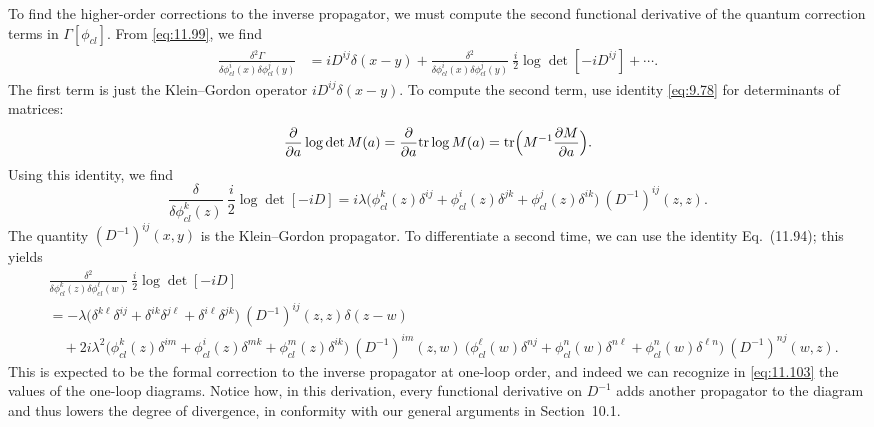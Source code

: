 To find the higher-order corrections to the inverse propagator, we must
compute the second functional derivative of the quantum correction terms in
$\Gamma[\phi_{cl}]$.  From \eqref{eq:11.99}, we find
\begin{equation}
  \begin{aligned}
    \frac{\delta^2\Gamma}{\delta\phi^i_{cl}(x)\delta\phi^j_{cl}(y)}
    &= iD^{ij}\delta(x-y) + \frac{\delta^2}{\delta\phi^i_{cl}(x)
      \delta\phi^j_{cl}(y)}\ \frac{i}{2}\log\det[-iD^{ij}] + \cdots .
  \end{aligned}
\end{equation}
The first term is just the Klein--Gordon operator $iD^{ij}\delta(x-y)$.  To
compute the second term, use identity \eqref{eq:9.78} for determinants of
matrices:
\begin{equation}
  \frac{\partial}{\partial a}\log\det M(a) = \frac{\partial}{\partial a}
    \mathrm{tr}\log M(a) = \mathrm{tr}\Bigl( M^{-1}\frac{\partial M}
      {\partial a} \Bigr) .
  \label{eq:11.101}
\end{equation}
Using this identity, we find
\begin{equation}
  \frac{\delta}{\delta\phi^k_{cl}(z)}\ \frac{i}{2}\log\det[-iD]
  = i\lambda\bigl( \phi^k_{cl}(z)\delta^{ij} + \phi^i_{cl}(z)\delta^{jk}
    + \phi^j_{cl}(z)\delta^{ik} \bigr)\ (D^{-1})^{ij}(z,z) .
  \label{eq:11.102}
\end{equation}
The quantity $(D^{-1})^{ij}(x,y)$ is the Klein--Gordon propagator.  To
differentiate a second time, we can use the identity Eq.~(11.94); this
yields
\begin{equation}
  \begin{aligned}
    &\frac{\delta^2}{\delta\phi^k_{cl}(z)\delta\phi^\ell_{cl}(w)}\
    \frac{i}{2}\log\det[-iD]\\
    &= -\lambda\bigl( \delta^{k\ell}\delta^{ij} + \delta^{ik}\delta^{j\ell}
      + \delta^{i\ell}\delta^{jk} \bigr)\ (D^{-1})^{ij}(z,z)\delta(z-w)\\
    &\quad + 2i\lambda^2\bigl( \phi^k_{cl}(z)\delta^{im} + \phi^i_{cl}(z)
      \delta^{mk} + \phi^m_{cl}(z)\delta^{ik} \bigr)\ (D^{-1})^{im}(z,w)\
      \bigl( \phi^\ell_{cl}(w)\delta^{nj} + \phi^n_{cl}(w)\delta^{n\ell}
        + \phi^{n}_{cl}(w)\delta^{\ell n} \bigr)\ (D^{-1})^{nj}(w,z) .
  \end{aligned}
  \label{eq:11.103}
\end{equation}
This is expected to be the formal correction to the inverse propagator at
one-loop order, and indeed we can recognize in \eqref{eq:11.103} the values of
the one-loop diagrams.  Notice how, in this derivation, every functional
derivative on $D^{-1}$ adds another propagator to the diagram and thus lowers
the degree of divergence, in conformity with our general arguments in
Section~10.1.

